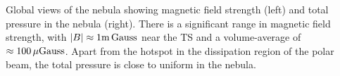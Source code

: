 \label{fig:slices} Global views of the nebula showing magnetic field strength (left) and total pressure in the nebula (right).  There is a significant range in magnetic field strength, with $|B|\approx1\rm m\, Gauss$ near the TS and a volume-average of $\approx 100\, \mu\rm Gauss$.  Apart from the hotspot in the dissipation region of the polar beam, the total pressure is close to uniform in the nebula.